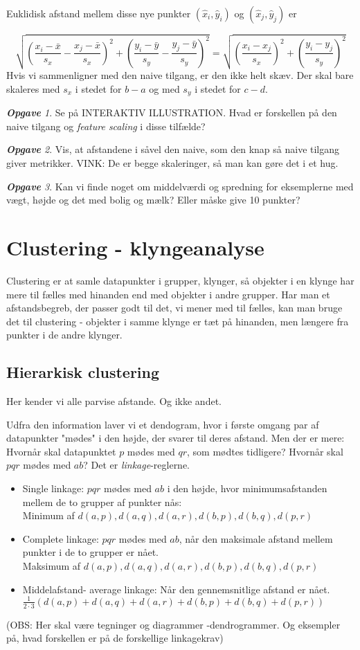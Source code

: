\documentclass[a4paper, 12pt]{article}
\theoremstyle{remark}
\newtheorem{Opgave}{\textbf{Opgave}}
\begin{document}
Euklidisk afstand mellem disse nye punkter $(\hat{x}_i,\hat{y}_i)$ og  $(\hat{x}_j,\hat{y}_j)$ er 

$$\sqrt{\left(\frac{x_i-\bar{x}}{s_x}-\frac{x_j-\bar{x}}{s_x}\right)^2 +\left(\frac{y_i-\bar{y}}{s_y}-\frac{y_j-\bar{y}}{s_y}\right)^2}=\sqrt{\left(\frac{x_i-x_j}{s_x}\right)^2+\left(\frac{y_i-y_j}{s_y}\right)^2}$$
Hvis vi sammenligner med den naive tilgang, er den ikke helt skæv. Der skal bare skaleres med $s_x$ i stedet for $b-a$ og med $s_y$ i stedet for $c-d$.
\begin{Opgave}
Se på INTERAKTIV ILLUSTRATION. Hvad er forskellen på den naive tilgang og \emph{feature scaling} i disse tilfælde? 
\end{Opgave}
\begin{Opgave}
Vis, at afstandene i såvel den naive, som den knap så naive tilgang giver metrikker. VINK: De er begge skaleringer, så man kan gøre det i et hug. 
\end{Opgave}
\begin{Opgave} Kan vi finde noget om middelværdi og spredning for eksemplerne med vægt, højde og det med bolig og mælk? Eller måske give 10 punkter? 
\end{Opgave}
\section*{Clustering - klyngeanalyse}

Clustering er at samle datapunkter i grupper, klynger, så objekter i en klynge har mere til fælles med hinanden end med objekter i andre grupper. Har man et afstandsbegreb, der passer godt til det, vi mener med til fælles, kan man bruge det til clustering - objekter i samme klynge er tæt på hinanden, men længere fra punkter i de andre klynger. 
\subsection*{Hierarkisk clustering}
Her kender vi alle parvise afstande. Og ikke andet. 

Udfra den information laver vi et dendogram, hvor i første omgang par af datapunkter "mødes"\; i den højde, der svarer til deres afstand. Men der er mere: Hvornår skal datapunktet $p$ mødes med $qr$, som mødtes tidligere? Hvornår skal $pqr$ mødes med $ab$?  Det er \emph{linkage}-reglerne.
\begin{itemize}
\item Single linkage: $pqr$ mødes med $ab$ i den højde, hvor minimumsafstanden mellem de to grupper af punkter nås:\\ Minimum af $d(a,p),d(a,q), d(a,r), d(b,p), d(b,q), d(p,r)$
\item Complete linkage: $pqr$ mødes med $ab$, når den maksimale afstand mellem punkter i de to grupper er nået. \\Maksimum af $d(a,p),d(a,q), d(a,r), d(b,p), d(b,q), d(p,r)$
\item Middelafstand- average linkage: Når den gennemsnitlige afstand er nået. $\frac{1}{2\cdot 3}(d(a,p)+d(a,q)+ d(a,r)+ d(b,p)+ d(b,q)+ d(p,r))$
\end{itemize}
(OBS: Her skal være tegninger og diagrammer -dendrogrammer. Og eksempler på, hvad forskellen er på de forskellige linkagekrav)
\end{document}
